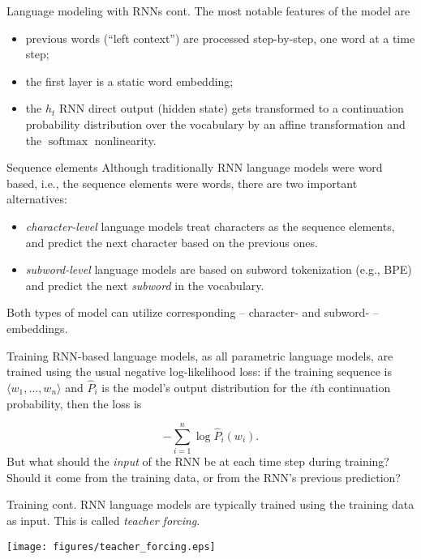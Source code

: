 \documentclass[style=upen, size=14pt]{powerdot}
\DeclareMathOperator*{\softmax}{softmax}
\newcommand{\gold}{\color{arany}}
\theoremstyle{definition}
\begin{document}
\begin{slide}[toc=]{Language modeling with RNNs cont.}
  The most notable features of the model are
  \begin{itemize}
  \item previous words (``left context'') are processed step-by-step, one word
    at a time step;
  \item the first layer is a static word embedding;
  \item the $h_t$ RNN direct output (hidden state) gets transformed to a
    continuation probability distribution over the vocabulary by an affine
    transformation and the $\softmax$ nonlinearity.
  \end{itemize}
\end{slide}

\begin{slide}[toc=Sequence elements]{Sequence elements}
  Although traditionally RNN language models were word based, i.e., the sequence
  elements were words, there are two important alternatives:
  \begin{itemize}
  \item \emph{\gold character-level} language models treat characters as the
    sequence elements, and predict the next character based on the previous ones.
  \item \emph{\gold subword-level} language models are based on subword
    tokenization (e.g., BPE) and predict the next \emph{subword} in the
    vocabulary.
  \end{itemize}
  Both types of model can utilize corresponding -- character- and subword- --
  embeddings.
\end{slide}

\begin{slide}[toc=Training]{Training}
  RNN-based language models, as all parametric language models, are trained
  using the usual negative log-likelihood loss: if the training sequence is
  $\langle w_1,\dots, w_n \rangle$ and $\hat P_i$ is the model's output
  distribution for the $i$th continuation probability, then the loss is

  $$
  - \sum_{i=1}^n \log \hat P_i(w_i).
  $$
  But what should the \emph{input} of the RNN be at each time step during
  training? Should it come from the training data, or from the RNN's previous
  prediction?
\end{slide}

\begin{slide}[toc=]{Training cont.}
  RNN language models are typically trained using the training data as input.
  This is called \emph{\gold teacher forcing}.
  \begin{center}
    \texttt{[image: figures/teacher\_forcing.eps]}
  \end{center}
\end{slide}
\end{document}
